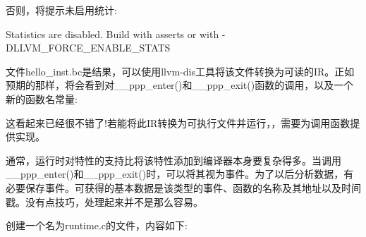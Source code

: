 否则，将提示未启用统计:

\begin{shell}
Statistics are disabled. Build with asserts or with
-DLLVM_FORCE_ENABLE_STATS
\end{shell}

文件hello\_inst.bc是结果，可以使用llvm-dis工具将该文件转换为可读的IR。正如预期的那样，将会看到对\_\_ppp\_enter()和\_\_ppp\_exit()函数的调用，以及一个新的函数名常量:


这看起来已经很不错了!若能将此IR转换为可执行文件并运行，，需要为调用函数提供实现。

通常，运行时对特性的支持比将该特性添加到编译器本身要复杂得多。当调用\_\_ppp\_enter()和\_\_ppp\_exit()时，可以将其视为事件。为了以后分析数据，有必要保存事件。可获得的基本数据是该类型的事件、函数的名称及其地址以及时间戳。没有点技巧，处理起来并不是那么容易。

创建一个名为runtime.c的文件，内容如下:

